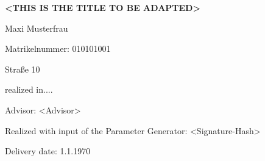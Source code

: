 \vspace*{15mm}

\begin{Large} 
\begin{center}
\textbf{<THIS IS THE TITLE TO BE ADAPTED>}
\end{center}
\end{Large}

\vspace*{15mm}

\begin{large} 
\begin{center}
Maxi Musterfrau
\end{center}
\end{large} 

\vspace*{-6mm}

\begin{large} 
\begin{center}
Matrikelnummer: 010101001
\end{center}
\end{large} 

\vspace*{-6mm}

\begin{large} 
\begin{center}
Straße 10
\end{center}
\end{large} 

\vspace*{-6mm}

\begin{large} 
\begin{center}
realized in....
\end{center}
\end{large} 

\vspace*{5mm}

\begin{large} 
\begin{center}
Advisor: <Advisor>
\end{center}
\end{large} 

\begin{large} 
\begin{center}
Realized with input of the Parameter Generator: <Signature-Hash>
\end{center}
\end{large} 



\vspace*{-6mm}

\begin{large} 
\begin{center}
Delivery date: 1.1.1970
\end{center}
\end{large} 


\pagestyle{empty} %

